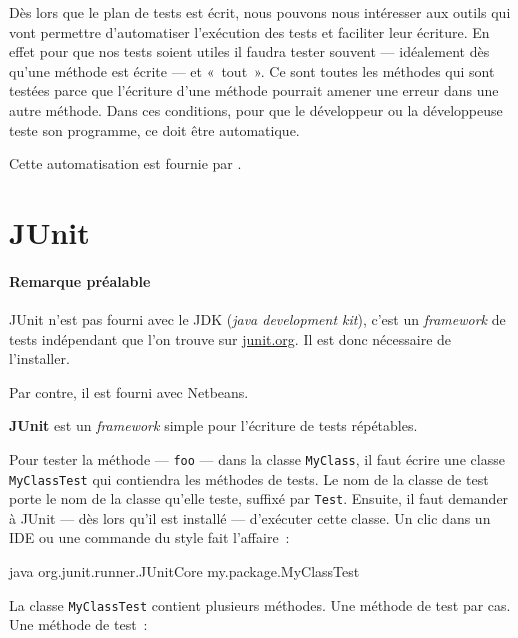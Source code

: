 Dès lors que le plan de tests est écrit, nous pouvons nous intéresser aux outils
qui vont permettre d'automatiser l'exécution des tests et faciliter leur
écriture.  En effet pour que nos tests soient utiles il faudra tester souvent
— idéalement dès qu'une méthode est écrite — et «~tout~». Ce sont toutes les
méthodes qui sont testées parce que l'écriture d'une méthode pourrait amener une
erreur dans une autre méthode. Dans ces conditions, pour que le développeur ou
la développeuse teste son programme, ce doit être automatique.  

Cette automatisation est fournie par .



\section{JUnit}

\paragraph{Remarque préalable} JUnit n'est pas fourni avec le JDK (\textit{java
development kit}), c'est un \textit{framework} de tests indépendant que l'on
trouve sur \url{junit.org}. Il est donc nécessaire de l'installer. 

Par contre, il est fourni avec Netbeans. 

\textbf{JUnit} est un \textit{framework} simple pour l'écriture de tests
répétables. 

Pour tester la méthode — \texttt{foo} — dans la classe \texttt{MyClass}, il faut
écrire une classe \texttt{MyClassTest} qui contiendra les méthodes de tests.  Le
nom de la classe de test porte le nom de la classe qu'elle teste, suffixé par
\texttt{Test}. Ensuite, il faut demander à JUnit — dès lors qu'il est installé
— d'exécuter cette classe. Un clic dans un IDE ou une commande du style fait
l'affaire~:

\begin{term}
	java org.junit.runner.JUnitCore my.package.MyClassTest
\end{term}

La classe \texttt{MyClassTest} contient plusieurs méthodes. Une méthode de test
par cas. Une méthode de test~: 

